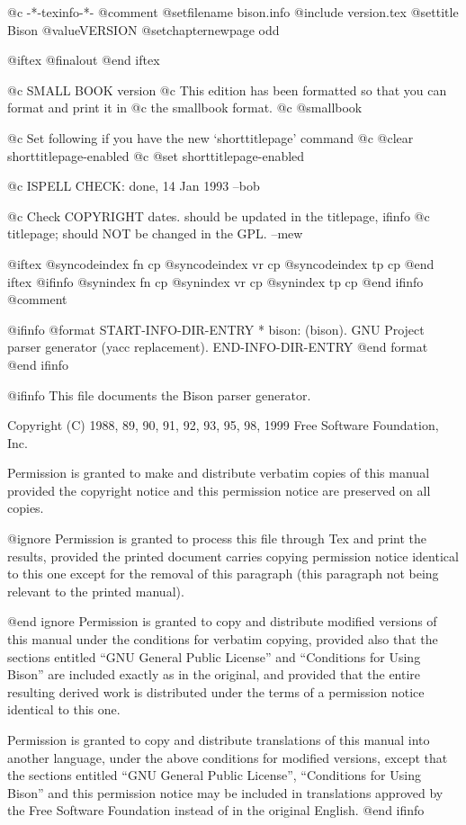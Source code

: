  @c -*-texinfo-*-
@comment %
@setfilename bison.info
@include version.tex
@settitle Bison @value{VERSION}
@setchapternewpage odd

@iftex
@finalout
@end iftex

@c SMALL BOOK version   
@c This edition has been formatted so that you can format and print it in
@c the smallbook format. 
@c @smallbook

@c Set following if you have the new `shorttitlepage' command
@c @clear shorttitlepage-enabled
@c @set shorttitlepage-enabled

@c ISPELL CHECK: done, 14 Jan 1993 --bob

@c Check COPYRIGHT dates.  should be updated in the titlepage, ifinfo
@c titlepage; should NOT be changed in the GPL.  --mew

@iftex
@syncodeindex fn cp
@syncodeindex vr cp
@syncodeindex tp cp
@end iftex
@ifinfo
@synindex fn cp
@synindex vr cp
@synindex tp cp
@end ifinfo
@comment %

@ifinfo
@format
START-INFO-DIR-ENTRY
* bison: (bison).	GNU Project parser generator (yacc replacement).
END-INFO-DIR-ENTRY
@end format
@end ifinfo

@ifinfo
This file documents the Bison parser generator.

Copyright (C) 1988, 89, 90, 91, 92, 93, 95, 98, 1999 Free Software Foundation, Inc.

Permission is granted to make and distribute verbatim copies of
this manual provided the copyright notice and this permission notice
are preserved on all copies.

@ignore
Permission is granted to process this file through Tex and print the
results, provided the printed document carries copying permission
notice identical to this one except for the removal of this paragraph
(this paragraph not being relevant to the printed manual).

@end ignore
Permission is granted to copy and distribute modified versions of this
manual under the conditions for verbatim copying, provided also that the
sections entitled ``GNU General Public License'' and ``Conditions for
Using Bison'' are included exactly as in the original, and provided that
the entire resulting derived work is distributed under the terms of a
permission notice identical to this one.

Permission is granted to copy and distribute translations of this manual
into another language, under the above conditions for modified versions,
except that the sections entitled ``GNU General Public License'',
``Conditions for Using Bison'' and this permission notice may be
included in translations approved by the Free Software Foundation
instead of in the original English.
@end ifinfo

